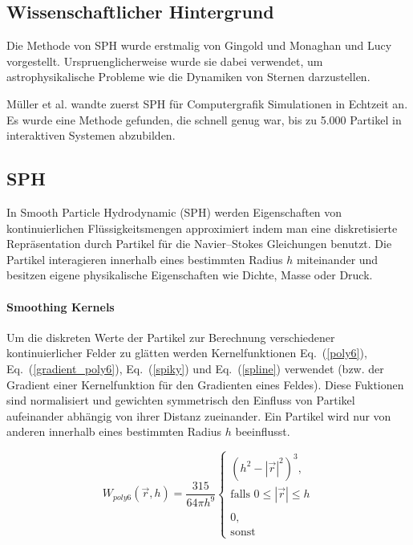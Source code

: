 \documentclass[a4paper]{paper}
\renewcommand{\eqref}[1]{Eq.~(\ref{#1})}
\begin{document}
\subsection{Wissenschaftlicher Hintergrund}
Die Methode von SPH wurde erstmalig von Gingold und Monaghan \citep{gingold1977smoothed} und Lucy \citep{lucy1977numerical} vorgestellt. Urspruenglicherweise wurde sie dabei verwendet, um astrophysikalische Probleme wie die Dynamiken von Sternen darzustellen.

Müller et al. \citep{muller2003particle} wandte zuerst SPH für Computergrafik Simulationen in Echtzeit an. Es wurde eine Methode gefunden, die schnell genug war, bis zu 5.000 Partikel in interaktiven Systemen abzubilden.


\subsection{SPH}
In Smooth Particle Hydrodynamic (SPH) werden Eigenschaften von kontinuierlichen Flüssigkeitsmengen approximiert indem man eine diskretisierte Repräsentation durch Partikel für die Navier–Stokes Gleichungen benutzt. 
Die Partikel interagieren innerhalb eines bestimmten Radius $h$ miteinander und besitzen eigene physikalische Eigenschaften wie  Dichte, Masse oder Druck.



\paragraph{Smoothing Kernels}
Um die diskreten Werte der Partikel zur Berechnung verschiedener kontinuierlicher Felder zu glätten werden Kernelfunktionen \eqref{poly6}, \eqref{gradient_poly6}, \eqref{spiky} und \eqref{spline} verwendet (bzw. der Gradient einer Kernelfunktion für den Gradienten eines Feldes). Diese Fuktionen sind normalisiert und gewichten symmetrisch den Einfluss von Partikel aufeinander abhängig von ihrer Distanz zueinander. Ein Partikel wird nur von anderen innerhalb eines bestimmten Radius $h$ beeinflusst.

\begin{equation}
\label{poly6}
W_{poly6}(\vec{r},h) = \frac{315}{64 \pi h^9} 
\begin{cases}
(h^2-|\vec{r}|^2)^3, \\ \text{falls } 0 \leq |\vec{r}| \leq h \\
\\
0, \\ \text{sonst}
\end{cases}
\end{equation}
\end{document}
